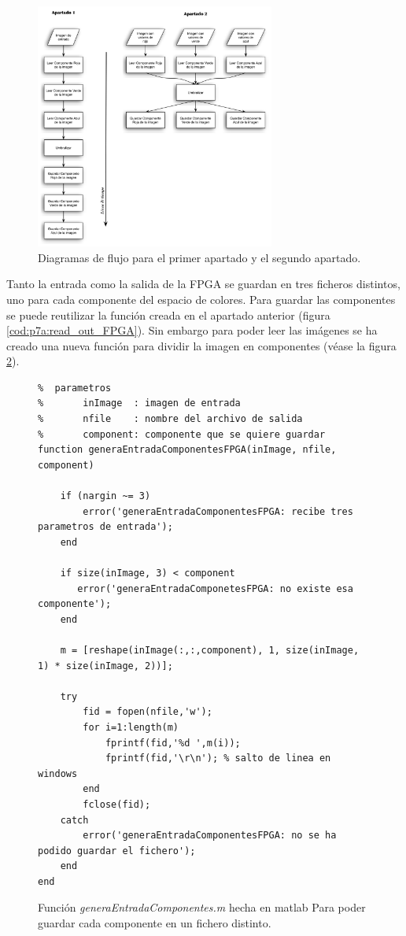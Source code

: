 \documentclass{article}
\begin{document}
\begin{figure}[h]
  \centering
    \includegraphics[width=0.7\textwidth]{img/p7b_paralelizacion.pdf}
  \caption{Diagramas de flujo para el primer apartado y el segundo apartado.}
  \label{fig:p7b:paralelizacion}
\end{figure}

Tanto la entrada como la salida de la FPGA se guardan en tres ficheros distintos, uno para cada componente del espacio de colores. Para guardar las componentes se puede reutilizar la función creada en el apartado anterior (figura \ref{cod:p7a:read_out_FPGA}). Sin embargo para poder leer las imágenes se ha creado una nueva función para dividir la imagen en componentes (véase la figura \ref{cod:p7b:generaEntradaComponentes}).

\begin{figure}[h]
	\begin{lstlisting}[style=matlab]	
%% Esta funcion crea un fichero de texto donde cada linea tiene hay un valor de la matriz de de las componentes
%  parametros
%       inImage  : imagen de entrada
%       nfile    : nombre del archivo de salida
%       component: componente que se quiere guardar
function generaEntradaComponentesFPGA(inImage, nfile, component)

    if (nargin ~= 3)
        error('generaEntradaComponentesFPGA: recibe tres parametros de entrada');
    end
    
    if size(inImage, 3) < component
       error('generaEntradaComponetesFPGA: no existe esa componente'); 
    end

    m = [reshape(inImage(:,:,component), 1, size(inImage, 1) * size(inImage, 2))];
    
    try
        fid = fopen(nfile,'w');
        for i=1:length(m)
            fprintf(fid,'%d ',m(i));
            fprintf(fid,'\r\n'); % salto de linea en windows
        end
        fclose(fid);
    catch
        error('generaEntradaComponentesFPGA: no se ha podido guardar el fichero');
    end
end
	\end{lstlisting}
	\caption{Función \emph{generaEntradaComponentes.m} hecha en matlab Para poder guardar cada componente en un fichero distinto.}
	\label{cod:p7b:generaEntradaComponentes}
\end{figure}	
\end{document}
